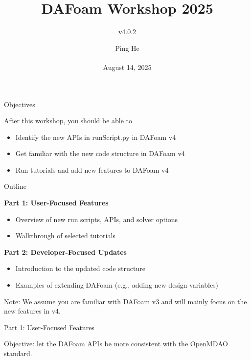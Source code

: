 \documentclass{bredelebeamer}
\title[ ]{DAFoam Workshop 2025}
\subtitle{v4.0.2}
\author{Ping He\\ ~ \\August 14, 2025 }
\date[August 14, 2025]{}
\begin{document}
\begin{frame}
  \titlepage
\end{frame}



\begin{frame}{Objectives}

After this workshop, you should be able to
\begin{itemize}
  \setlength\itemsep{1em}
 \item Identify the new APIs in runScript.py in DAFoam v4
 \item Get familiar with the new code structure in DAFoam v4 
 \item Run tutorials and add new features to DAFoam v4
\end{itemize} 

\end{frame}


\begin{frame}{Outline}

\textbf{Part 1: User-Focused Features}
\begin{itemize}
  \setlength\itemsep{1em}
 \item Overview of new run scripts, APIs, and solver options
 \item Walkthrough of selected tutorials
\end{itemize}

\textbf{Part 2: Developer-Focused Updates}
\begin{itemize}
  \setlength\itemsep{1em}
 \item Introduction to the updated code structure
 \item Examples of extending DAFoam (e.g., adding new design variables)
\end{itemize}

Note: We assume you are familiar with DAFoam v3 and will mainly focus on the new features in v4.

\end{frame}

\begin{frame}{}

  \begin{center}
     \noindent \Large{Part 1: User-Focused Features}
  \end{center}

  \begin{center}
    \noindent \large{Objective: let the DAFoam APIs be more consistent with the OpenMDAO standard.}
 \end{center}
  
  \end{frame}
\end{document}
